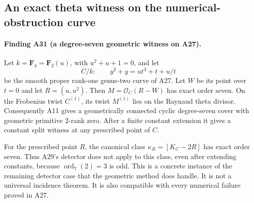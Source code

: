 \subsection{An exact theta witness on the numerical-obstruction curve}
\label{sec:a27-theta-seven}

\paragraph{Finding A31 (a degree-seven geometric witness on A27).}
Let $k=\mathbf F_4=\mathbf F_2(u)$, with $u^2+u+1=0$, and let
\[
 C/k:\qquad y^2+y=u t^3+t+u/t
 \tag{TS.1}
\]
be the smooth proper rank-one genus-two curve of A27.  Let $W$ be
its point over $t=0$ and let $R=(u,u^2)$.  Then
$M=\mathcal O_C(R-W)$ has exact order seven.  On the Frobenius
twist $C^{(1)}$, its twist $M^{(1)}$ lies on the Raynaud theta
divisor.  Consequently A11 gives a geometrically connected cyclic
degree-seven cover with geometric primitive $2$-rank zero.  After
a finite constant extension it gives a constant split witness at
any prescribed point of $C$.

For the prescribed point $R$, the canonical class
$\kappa_R=[K_C-2R]$ has exact order seven.  Thus A29's detector
does not apply to this class, even after extending constants,
because $\operatorname{ord}_7(2)=3$ is odd.  This is a concrete
instance of the remaining detector case that the geometric method
does handle.  It is not a universal incidence theorem.  It is also
compatible with every numerical failure proved in A27.

